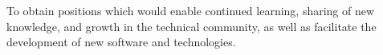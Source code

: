 \begin{details}
    \immediate{}
    
\end{details}

\begin{objective}
    To obtain positions which would enable continued learning, sharing of new
    knowledge, and growth in the technical community, as well as facilitate
    the development of new software and technologies.
\end{objective}

